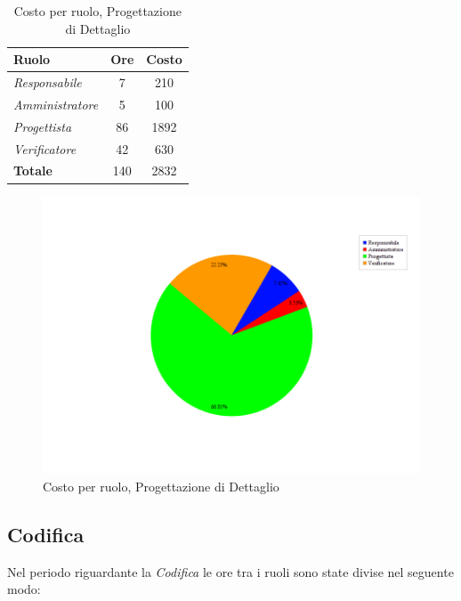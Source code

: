 \begin{table}[H]
	\begin{center}
		\begin{tabular}{|l|c|c|}
			\hline
			\textbf{Ruolo}	& \textbf{Ore} &	\textbf{Costo}	 \\
			\hline
			\textit{Responsabile}	&	7	&	210		\\
			\hline
			\textit{Amministratore}	&	5	&	100		\\
			\hline
			\textit{Progettista}		&	86	&	1892	\\
			\hline
			\textit{Verificatore}	&	42	&	630		\\
			\hline
			\textbf{Totale}	&	140	&	2832	\\
			\hline
		\end{tabular}
	\end{center}
	\caption{Costo per ruolo, Progettazione di Dettaglio}
\end{table}

\begin{figure}[H]
	\centering
	\includegraphics[scale=0.4]{immagini/Grafi/CostoPD}
	\caption{Costo per ruolo, Progettazione di Dettaglio}
\end{figure}


\subsection{Codifica}
Nel periodo riguardante la \textit{Codifica} le ore tra i ruoli sono state divise nel seguente modo:

